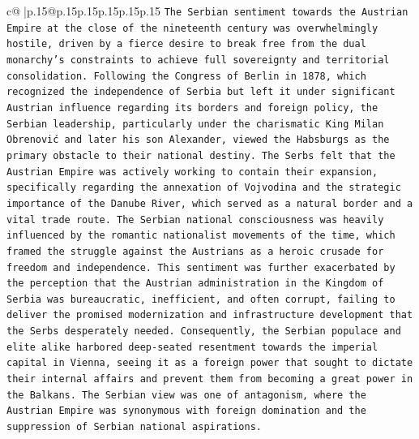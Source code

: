 \documentclass{article}
\begin{document}
{\begin{supertabular}{c@{$\;$}|p{.15\linewidth}@{}p{.15\linewidth}p{.15\linewidth}p{.15\linewidth}p{.15\linewidth}p{.15\linewidth}}
{{{\texttt{The Serbian sentiment towards the Austrian Empire at the close of the nineteenth century was overwhelmingly hostile, driven by a fierce desire to break free from the dual monarchy's constraints to achieve full sovereignty and territorial consolidation. Following the Congress of Berlin in 1878, which recognized the independence of Serbia but left it under significant Austrian influence regarding its borders and foreign policy, the Serbian leadership, particularly under the charismatic King Milan Obrenović and later his son Alexander, viewed the Habsburgs as the primary obstacle to their national destiny. The Serbs felt that the Austrian Empire was actively working to contain their expansion, specifically regarding the annexation of Vojvodina and the strategic importance of the Danube River, which served as a natural border and a vital trade route. The Serbian national consciousness was heavily influenced by the romantic nationalist movements of the time, which framed the struggle against the Austrians as a heroic crusade for freedom and independence. This sentiment was further exacerbated by the perception that the Austrian administration in the Kingdom of Serbia was bureaucratic, inefficient, and often corrupt, failing to deliver the promised modernization and infrastructure development that the Serbs desperately needed. Consequently, the Serbian populace and elite alike harbored deep{-}seated resentment towards the imperial capital in Vienna, seeing it as a foreign power that sought to dictate their internal affairs and prevent them from becoming a great power in the Balkans. The Serbian view was one of antagonism, where the Austrian Empire was synonymous with foreign domination and the suppression of Serbian national aspirations.} \\
\\ 
}}}
\end{supertabular}}
\end{document}
